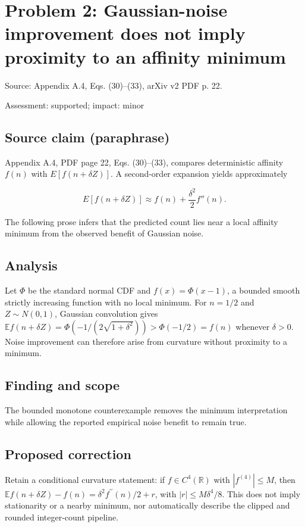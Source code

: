 \documentclass[11pt]{article}
\begin{document}
\section*{Problem 2: Gaussian-noise improvement does not imply proximity to an affinity minimum}

Source: Appendix A.4, Eqs. (30)–(33), arXiv v2 PDF p. 22.

Assessment: supported; impact: minor

\subsection*{Source claim (paraphrase)}

Appendix A.4, PDF page 22, Eqs. (30)–(33), compares deterministic affinity \(f(n)\) with \(E[f(n+\delta Z)]\). A second-order expansion yields approximately

\[ E[f(n+\delta Z)]\approx f(n)+\frac{\delta^2}{2}f''(n). \]

The following prose infers that the predicted count lies near a local affinity minimum from the observed benefit of Gaussian noise.

\subsection*{Analysis}

Let \(\Phi\) be the standard normal CDF and \(f(x)=\Phi(x-1)\), a bounded smooth strictly increasing function with no local minimum. For \(n=1/2\) and \(Z\sim N(0,1)\), Gaussian convolution gives \(\mathbb E f(n+\delta Z)=\Phi(-1/(2\sqrt{1+\delta^2}))>\Phi(-1/2)=f(n)\) whenever \(\delta>0\). Noise improvement can therefore arise from curvature without proximity to a minimum.

\subsection*{Finding and scope}

The bounded monotone counterexample removes the minimum interpretation while allowing the reported empirical noise benefit to remain true.

\subsection*{Proposed correction}

Retain a conditional curvature statement: if \(f\in C^4(\mathbb R)\) with \(|f^{(4)}|\le M\), then \(\mathbb E f(n+\delta Z)-f(n)=\delta^2 f^{\prime\prime}(n)/2+r\), with \(|r|\le M\delta^4/8\). This does not imply stationarity or a nearby minimum, nor automatically describe the clipped and rounded integer-count pipeline.
\end{document}
